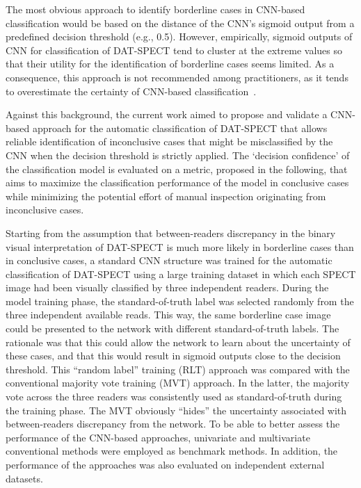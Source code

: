 
The most obvious approach to identify borderline cases in CNN-based classification would be based on the distance of the CNN's sigmoid output from a predefined decision threshold (e.g., 0.5). 
However, empirically, sigmoid outputs of CNN for classification of DAT-SPECT tend to cluster at the extreme values so that their utility for the identification of borderline cases seems limited.  
As a consequence, this approach is not recommended among practitioners, as it tends to overestimate the certainty of CNN-based classification~\citep{Ulmer2021, Guo2017, Karimi2020}.


Against this background, the current work aimed to propose and validate a CNN-based approach for the automatic classification of DAT-SPECT 
that allows reliable identification of inconclusive cases that might be misclassified by the CNN when the decision threshold is strictly applied.
The `decision confidence' of the classification model is evaluated on a metric, proposed in the following, 
that aims to maximize the classification performance of the model in conclusive cases
while minimizing the potential effort of manual inspection originating from inconclusive cases.

Starting from the assumption that between-readers discrepancy in the binary visual interpretation of DAT-SPECT 
is much more likely in borderline cases than in conclusive cases, 
a standard CNN structure was trained for the automatic classification of DAT-SPECT using a large training dataset 
in which each SPECT image had been visually classified by three independent readers. 
During the model training phase, the standard-of-truth label was selected randomly from the three independent available reads. 
This way, the same borderline case image could be presented to the network with different standard-of-truth labels. 
The rationale was that this could allow the network to learn about the uncertainty of these cases, 
and that this would result in sigmoid outputs close to the decision threshold.
This “random label” training (RLT) approach was compared with the conventional majority vote training (MVT) approach. 
In the latter, the majority vote across the three readers was consistently used as standard-of-truth during the training phase. 
The MVT obviously “hides” the uncertainty associated with between-readers discrepancy from the network. 
To be able to better assess the performance of the CNN-based approaches, univariate and multivariate conventional methods were employed as 
benchmark methods. 
In addition, the performance of the approaches was also evaluated on independent external datasets.

